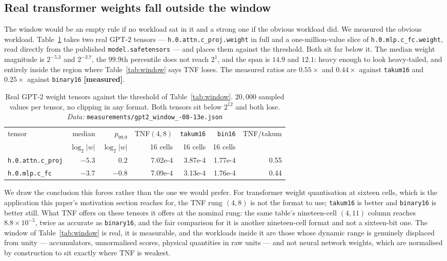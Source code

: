 \subsection{Real transformer weights fall outside the window}

The window would be an empty rule if no workload sat in it and a strong one if the
obvious workload did. We measured the obvious workload. Table~\ref{tab:gpt2window}
takes two real GPT-2 tensors --- \texttt{h.0.attn.c\_proj.weight} in full and a
one-million-value slice of \texttt{h.0.mlp.c\_fc.weight}, read directly from the
published \texttt{model.safetensors} --- and places them against the threshold.
Both sit far below it. The median weight magnitude is $2^{-5.3}$ and $2^{-3.7}$, the
$99.9$th percentile does not reach $2^{1}$, and the span is $14.9$ and $12.1$: heavy
enough to look heavy-tailed, and entirely inside the region where
Table~\ref{tab:window} says TNF loses. The measured ratios are $0.55\times$ and
$0.44\times$ against \texttt{takum16} and $0.25\times$ against \texttt{binary16}
\textbf{[measured]}.

\begin{table}[htbp]\centering\small
\caption{Real GPT-2 weight tensors against the threshold of
Table~\ref{tab:window}. $20{,}000$ sampled values per tensor, no clipping in any
format. Both tensors sit below $2^{12}$ and both lose. \emph{Data:} \texttt{measurements/\allowbreak gpt2\_\allowbreak window\_-08-13e.json}}
\label{tab:gpt2window}
\begin{tabular}{lrrrrrr}
\hline
tensor & median & $p_{99.9}$ & TNF$(4,8)$ & \texttt{takum16} & \texttt{bin16} & TNF/takum \\
 & $\log_2|w|$ & $\log_2|w|$ & 16 cells & 16 cells & 16 cells & \\
\hline
\texttt{h.0.attn.c\_proj} & $-5.3$ & $0.2$ & 7.02e-4 & 3.87e-4 & 1.77e-4 & 0.55 \\
\texttt{h.0.mlp.c\_fc} & $-3.7$ & $-0.8$ & 7.09e-4 & 3.13e-4 & 1.76e-4 & 0.44 \\
\hline
\end{tabular}
\end{table}

We draw the conclusion this forces rather than the one we would prefer. For
transformer weight quantisation at sixteen cells, which is the application this
paper's motivation section reaches for, the TNF rung $(4,8)$ is not the format to
use; \texttt{takum16} is better and \texttt{binary16} is better still. What TNF
offers on these tensors it offers at the nominal rung: the same table's nineteen-cell
$(4,11)$ column reaches $8.8\times 10^{-5}$, twice as accurate as
\texttt{binary16}, and the fair comparison for it is another nineteen-cell format
and not a sixteen-bit one. The window of Table~\ref{tab:window} is real, it is
measurable, and the workloads inside it are those whose dynamic range is genuinely
displaced from unity --- accumulators, unnormalised scores, physical quantities in
raw units --- and not neural network weights, which are normalised by construction
to sit exactly where TNF is weakest.

